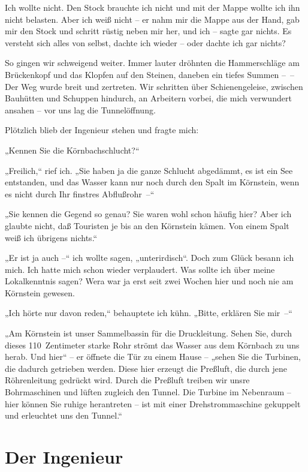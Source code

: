 Ich wollte nicht. Den Stock brauchte ich nicht und mit der Mappe
wollte ich ihn nicht belasten. Aber ich weiß nicht – er nahm mir
die Mappe aus der Hand, gab mir den Stock und schritt rüstig neben
mir her, und ich – sagte gar nichts. Es versteht sich alles von
selbst, dachte ich wieder – oder dachte ich gar nichts?

So gingen wir schweigend weiter. Immer lauter dröhnten die
Hammerschläge am Brückenkopf und das Klopfen auf den Steinen,
daneben ein tiefes Summen –~–Der Weg wurde breit und zertreten. Wir
schritten über Schienengeleise, zwischen Bauhütten und Schuppen
hindurch, an Arbeitern vorbei, die mich verwundert ansahen – vor
uns lag die Tunnelöffnung.

Plötzlich blieb der Ingenieur stehen und fragte mich:

„Kennen Sie die Körnbachschlucht?“

„Freilich,“ rief ich. „Sie haben ja die ganze Schlucht abgedämmt,
es ist ein See entstanden, und das Wasser kann nur noch durch den
Spalt im Körnstein, wenn es nicht durch Ihr finstres Abflußrohr~–“

„Sie kennen die Gegend so genau? Sie waren wohl schon häufig hier?
Aber ich glaubte nicht, daß Touristen je bis an den Körnstein
kämen. Von einem Spalt weiß ich übrigens nichts.“

„Er ist ja auch –“ ich wollte sagen, „unterirdisch“. Doch zum Glück
besann ich mich. Ich hatte mich schon wieder verplaudert. Was
sollte ich über meine Lokalkenntnis sagen? Wera war ja erst seit
zwei Wochen hier und noch nie am Körnstein gewesen.

„Ich hörte nur davon reden,“ behauptete ich kühn. „Bitte, erklären
Sie mir~–“

„Am Körnstein ist unser Sammelbassin für die Druckleitung. Sehen
Sie, durch dieses 110~Zentimeter starke Rohr strömt das Wasser aus
dem Körnbach zu uns herab. Und hier“ – er öffnete die Tür zu einem
Hause – „sehen Sie die Turbinen, die dadurch getrieben werden.
Diese hier erzeugt die Preßluft, die durch jene Röhrenleitung
gedrückt wird. Durch die Preßluft treiben wir unsre Bohrmaschinen
und lüften zugleich den Tunnel. Die Turbine im Nebenraum – hier
können Sie ruhige herantreten – ist mit einer Drehstrommaschine
gekuppelt und erleuchtet uns den Tunnel.“

\section{Der Ingenieur\ausaspirastagebuch}

